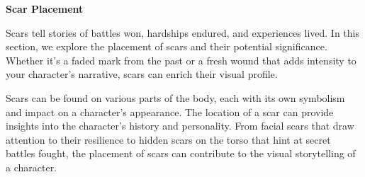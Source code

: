 \textbf{Scar Placement}

Scars tell stories of battles won, hardships endured, and experiences
lived. In this section, we explore the placement of scars and their
potential significance. Whether it's a faded mark from the past or a
fresh wound that adds intensity to your character's narrative, scars can
enrich their visual profile.

Scars can be found on various parts of the body, each with its own
symbolism and impact on a character's appearance. The location of a scar
can provide insights into the character's history and personality. From
facial scars that draw attention to their resilience to hidden scars on
the torso that hint at secret battles fought, the placement of scars can
contribute to the visual storytelling of a character.

